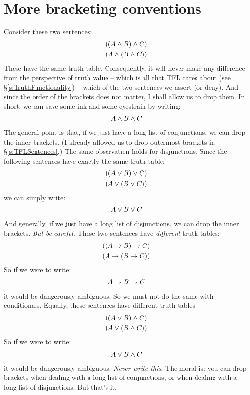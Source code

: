 \section{More bracketing conventions}\label{s:MoreBracketingConventions}
Consider these two sentences:
	\begin{align*}
		((A \wedge B) \wedge C)\\
		(A \wedge (B \wedge C))
	\end{align*}
These have the same truth table. Consequently, it will never make any difference from the perspective of truth value -- which is all that TFL cares about (see \S\ref{s:TruthFunctionality}) -- which of the two sentences we assert (or deny). And since the order of the brackets does not matter, I shall allow us to drop them.  In short, we can save some ink and some eyestrain by writing:
	\begin{align*}
		A \wedge B \wedge C
	\end{align*}
The general point is that, if we just have a long list of conjunctions, we can drop the inner brackets. (I already allowed us to drop outermost brackets in \S\ref{s:TFLSentences}.) The same observation holds for disjunctions. Since the following sentences have exactly the same truth table:
	\begin{align*}
		((A \vee B) \vee C)\\
		(A \vee (B \vee C))
	\end{align*}
we can simply write:
	\begin{align*}
		A \vee B \vee C
	\end{align*}
And generally, if we just have a long list of disjunctions, we can drop the inner brackets. \emph{But be careful}. These two sentences have \emph{different} truth tables:
	\begin{align*}
		((A \rightarrow B) \rightarrow C)\\
		(A \rightarrow (B \rightarrow C))
	\end{align*}
So if we were to write:
	\begin{align*}
		A \rightarrow B \rightarrow C
	\end{align*}
it would be dangerously ambiguous. So we must not do the same with conditionals. Equally, these sentences have different truth tables:
	\begin{align*}
		((A \vee B) \wedge C)\\
		(A \vee (B \wedge C))
	\end{align*}
So if we were to write:
	\begin{align*}
		A \vee B \wedge C
	\end{align*}
it would be dangerously ambiguous. \emph{Never write this.} The moral is: you can drop brackets when dealing with a long list of conjunctions, or when dealing with a long list of disjunctions. But that's it.


